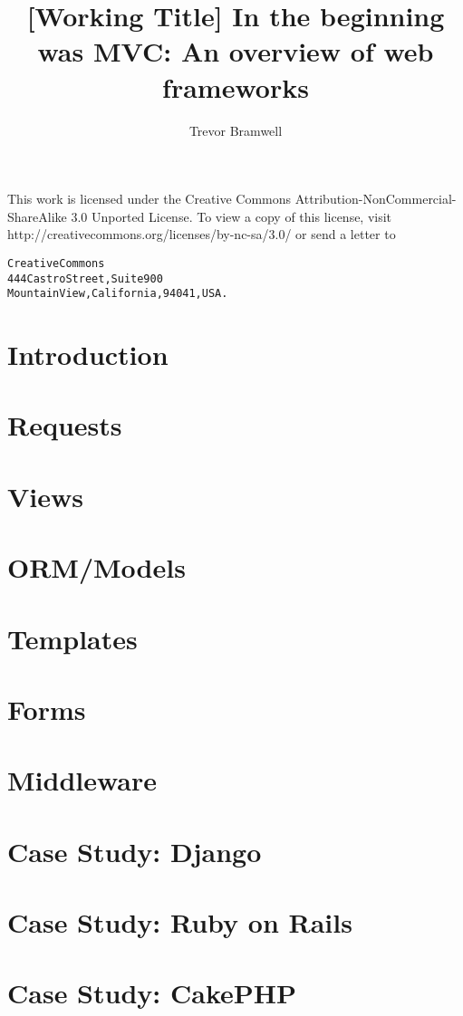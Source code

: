 \documentclass[12pt]{article}
\title{[Working Title] In the beginning was MVC: An overview of web
frameworks}
\author{Trevor Bramwell}
\date{}
\newcommand{\blankpage}{
    \newpage
    \thispagestyle{empty}
    \mbox{}
    \newpage
}
\begin{document}
\maketitle

\newpage

This work is licensed under the Creative Commons 
Attribution-NonCommercial-ShareAlike 3.0 Unported License.
To view a copy of this license, visit \\
http://creativecommons.org/licenses/by-nc-sa/3.0/
or send a letter to

\begin{alltt}
Creative Commons
444 Castro Street, Suite 900
Mountain View, California, 94041, USA.
\end{alltt}


\blankpage

\tableofcontents

\section{Introduction}
\section{Requests}
\section{Views}
\section{ORM/Models}
\section{Templates}
\section{Forms}
\section{Middleware}

\section{Case Study: Django}
\section{Case Study: Ruby on Rails}
\section{Case Study: CakePHP}
\end{document}
